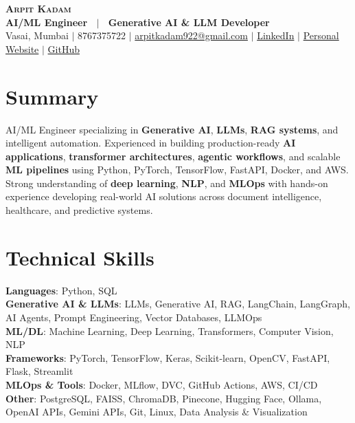 \documentclass[letterpaper,10.5pt]{article}
\begin{document}
\begin{center}
    \textbf{\Huge \scshape Arpit Kadam} \\ \vspace{2pt}
    \textbf{\small AI/ML Engineer \ $|$ \ Generative AI \& LLM Developer} \\ \vspace{4pt}
    \small Vasai, Mumbai $|$ 8767375722 $|$
    \href{mailto:arpitkadam922@gmail.com}{arpitkadam922@gmail.com} $|$
    \href{https://www.linkedin.com/in/arpitkadam/}{LinkedIn} $|$
    \href{https://arpit-kadam.netlify.app/}{Personal Website} $|$
    \href{https://github.com/ArpitKadam}{GitHub}
\end{center}

\section{Summary}
\small{AI/ML Engineer specializing in \textbf{Generative AI}, \textbf{LLMs}, \textbf{RAG systems}, and intelligent automation. Experienced in building production-ready \textbf{AI applications}, \textbf{transformer architectures}, \textbf{agentic workflows}, and scalable \textbf{ML pipelines} using Python, PyTorch, TensorFlow, FastAPI, Docker, and AWS. Strong understanding of \textbf{deep learning}, \textbf{NLP}, and \textbf{MLOps} with hands-on experience developing real-world AI solutions across document intelligence, healthcare, and predictive systems.}

\section{Technical Skills}
 \begin{itemize}[leftmargin=0.15in, label={}]
    \small{\item{
     \textbf{Languages}{: Python, SQL} \\
     \textbf{Generative AI \& LLMs}{: LLMs, Generative AI, RAG, LangChain, LangGraph, AI Agents, Prompt Engineering, Vector Databases, LLMOps} \\
     \textbf{ML/DL}{: Machine Learning, Deep Learning, Transformers, Computer Vision, NLP} \\
     \textbf{Frameworks}{: PyTorch, TensorFlow, Keras, Scikit-learn, OpenCV, FastAPI, Flask, Streamlit} \\
     \textbf{MLOps \& Tools}{: Docker, MLflow, DVC, GitHub Actions, AWS, CI/CD} \\
     \textbf{Other}{: PostgreSQL, FAISS, ChromaDB, Pinecone, Hugging Face, Ollama, OpenAI APIs, Gemini APIs, Git, Linux, Data Analysis \& Visualization}
    }}
 \end{itemize}
\end{document}
